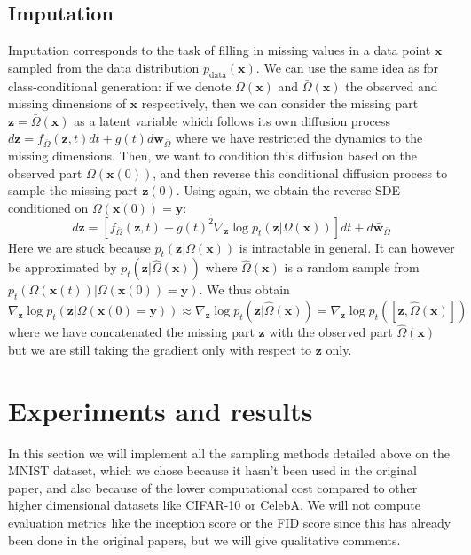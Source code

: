\documentclass{article}
\begin{document}
\subsection{Imputation} \label{subsec:imputation}
Imputation corresponds to the task of filling in missing values in a data point $\mathbf{x}$ sampled from the data distribution $p_\text{data}(\mathbf{x})$.
We can use the same idea as for class-conditional generation: if we denote $\Omega(\mathbf{x})$ and $\bar{\Omega}(\mathbf{x})$ the observed and missing dimensions of $\mathbf{x}$ respectively,
then we can consider the missing part $\mathbf{z}=\bar{\Omega}(\mathbf{x})$ as a latent variable which follows its own diffusion process $d\mathbf{z}=f_{\bar{\Omega}}(\mathbf{z},t)dt+g(t)d\mathbf{w}_{\bar{\Omega}}$
where we have restricted the dynamics to the missing dimensions.
Then, we want to condition this diffusion based on the observed part $\Omega(\mathbf{x}(0))$, and then reverse this conditional diffusion process to sample the missing part $\mathbf{z}(0)$.
Using \cite{anderson} again, we obtain the reverse SDE conditioned on $\Omega(\mathbf{x}(0))=\mathbf{y}$:
\begin{equation}
    d\mathbf{z}=[f_{\bar{\Omega}}(\mathbf{z},t)-g(t)^2\nabla_\mathbf{z}\log p_t(\mathbf{z}|\Omega(\mathbf{x}))]dt+d\mathbf{\bar{w}}_{\bar{\Omega}}
\end{equation}
Here we are stuck because $p_t(\mathbf{z}|\Omega(\mathbf{x}))$ is intractable in general. It can however be approximated by $p_t(\mathbf{z}|\hat{\Omega}(\mathbf{x}))$
where $\hat{\Omega}(\mathbf{x})$ is a random sample from $p_t(\Omega(\mathbf{x}(t))|\Omega(\mathbf{x}(0))=\mathbf{y})$. We thus obtain
$\nabla_\mathbf{z}\log p_t(\mathbf{z}|\Omega(\mathbf{x}(0)=\mathbf{y}))\approx\nabla_\mathbf{z}\log p_t(\mathbf{z}|\hat{\Omega}(\mathbf{x}))=\nabla_\mathbf{z}\log p_t(\left[ \mathbf{z}, \hat{\Omega}(\mathbf{x}) \right])$
where we have concatenated the missing part $\mathbf{z}$ with the observed part $\hat{\Omega}(\mathbf{x})$ but we are still taking the gradient only with respect to $\mathbf{z}$ only.

\section{Experiments and results} \label{sec:experiments}
In this section we will implement all the sampling methods detailed above on the MNIST dataset, which we chose because it hasn't been used in the original paper, and also 
because of the lower computational cost compared to other higher dimensional datasets like CIFAR-10 or CelebA. We will not compute evaluation metrics like the inception score or the FID score since
this has already been done in the original papers, but we will give qualitative comments.
\end{document}
